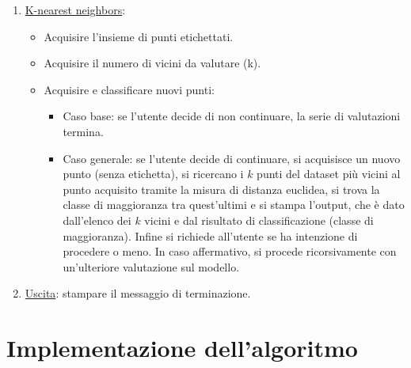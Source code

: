 \documentclass[11pt]{article}
\theoremstyle{definition}
\begin{document}
\begin{itemize}
\begin{enumerate}
     \item \underline{K-nearest neighbors}: 
       \begin{itemize}
         \item Acquisire l'insieme di punti etichettati.
         \item Acquisire il numero di vicini da valutare (k).
         \item Acquisire e classificare nuovi punti:
         \begin{itemize}
           \item Caso base: se l'utente decide di non continuare, la serie di valutazioni termina.
           \item Caso generale: se l'utente decide di continuare, si acquisisce un nuovo punto (senza etichetta), si ricercano i $k$ punti del dataset più vicini al punto acquisito tramite la misura di distanza euclidea, si trova la classe di maggioranza tra quest'ultimi e si stampa l'output, che è dato dall'elenco dei $k$ vicini e dal risultato di classificazione (classe di maggioranza). Infine si richiede all'utente se ha intenzione di procedere o meno. In caso affermativo, si procede ricorsivamente con un'ulteriore valutazione sul modello.
         \end{itemize}
       \end{itemize}
      \item \underline{Uscita}: stampare il messaggio di terminazione.
\end{enumerate}
\end{itemize}

\newpage

\section{Implementazione dell'algoritmo}
\end{document}
